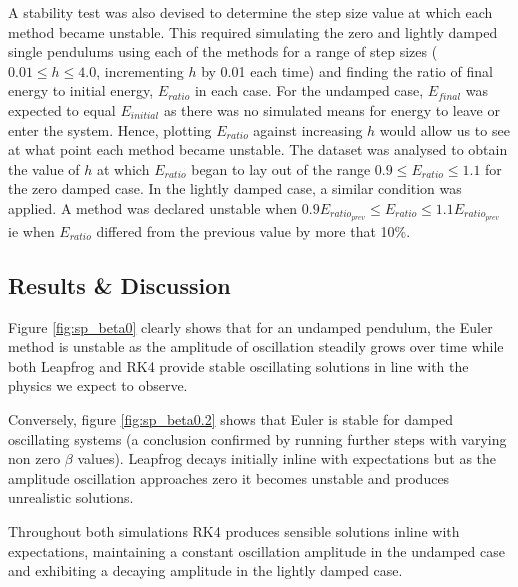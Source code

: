 \documentclass[11pt]{article}
\begin{document}
A stability test was also devised to determine the step size value at which each method became unstable. This required simulating the zero and lightly damped single pendulums using each of the methods for a range of step sizes ($0.01 \leq h \leq 4.0$, incrementing $h$ by 0.01 each time) and finding the ratio of final energy to initial energy, $E_{ratio}$ in each case. For the undamped case, $E_{final}$ was expected to equal $E_{initial}$ as there was no simulated means for energy to leave or enter the system. Hence, plotting $E_{ratio}$ against increasing $h$ would allow us to see at what point each method became unstable. The dataset was analysed to obtain the value of $h$ at which $E_{ratio}$ began to lay out of the range $0.9 \leq E_{ratio} \leq 1.1$ for the zero damped case. In the lightly damped case, a similar condition was applied. A method was declared unstable when $0.9 E_{ratio_{prev}}  \leq E_{ratio} \leq 1.1 E_{ratio_{prev}}$ ie when $E_{ratio}$ differed from the previous value by more that 10\%.

\subsection{Results \& Discussion}

Figure \ref{fig:sp_beta0} clearly shows that for an undamped pendulum, the Euler method is unstable as the amplitude of oscillation steadily grows over time while both Leapfrog and RK4 provide stable oscillating solutions in line with the physics we expect to observe.

Conversely, figure \ref{fig:sp_beta0.2} shows that Euler is stable for damped oscillating systems (a conclusion confirmed by running further steps with varying non zero $\beta$ values). Leapfrog decays initially inline with expectations but as the amplitude oscillation approaches zero it becomes unstable and produces unrealistic solutions.

Throughout both simulations RK4 produces sensible solutions inline with expectations, maintaining a constant oscillation amplitude in the undamped case and exhibiting a decaying amplitude in the lightly damped case.
\end{document}
